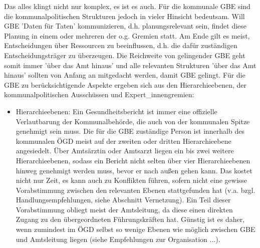 \documentclass{article}
\begin{document}
Das alles klingt nicht nur komplex, es ist es auch. Für die kommunale GBE sind die kommunalpolitischen Strukturen jedoch in vieler Hinsicht bedeutsam\autocite{AlbrichC2017}. Will GBE 'Daten für Taten' kommunizieren, d.h. planungsrelevant sein, findet diese Planung in einem oder mehreren der o.g. Gremien statt. Am Ende gilt es meist, Entscheidungen über Ressourcen zu beeinflussen, d.h. die dafür zuständigen Entscheidungsträger zu überzeugen. Die Reichweite von gelingender GBE geht somit immer 'über das Amt hinaus' und alle relevanten Strukturen 'über das Amt hinaus' sollten von Anfang an mitgedacht werden, damit GBE gelingt. Für die GBE zu berücksichtigende Aspekte ergeben sich aus den Hierarchieebenen, der kommunalpolitischen Ausschüssen und Expert\_innengremien:

\begin{itemize}
\item Hierarchieebenen: Ein Gesundheitsbericht ist immer eine offizielle Verlautbarung der Kommunalbehörde, die auch von der kommunalen Spitze genehmigt sein muss. Die für die GBE zuständige Person ist innerhalb des kommunalen ÖGD meist auf der zweiten oder dritten Hierarchieebene angesiedelt. Über Amtsärztin oder Amtsarzt liegen ein bis zwei weitere Hierarchieebenen, sodass ein Bericht nicht selten über vier Hierarchieebenen hinweg genehmigt werden muss, bevor er nach außen gehen kann. Das kostet nicht nur Zeit, es kann auch zu Konflikten führen, sofern nicht eine gewisse Vorabstimmung zwischen den relevanten Ebenen stattgefunden hat (v.a. bzgl. Handlungsempfehlungen, siehe Abschnitt Vernetzung). Ein Teil dieser Vorabstimmung obliegt meist der Amtsleitung, da diese einen direkten Zugang zu den übergeordneten Führungskräften hat. Günstig ist es daher, wenn zumindest im ÖGD selbst so wenige Ebenen wie möglich zwischen GBE und Amtsleitung liegen (siehe Empfehlungen zur Organisation ...).



\end{itemize}
\end{document}
